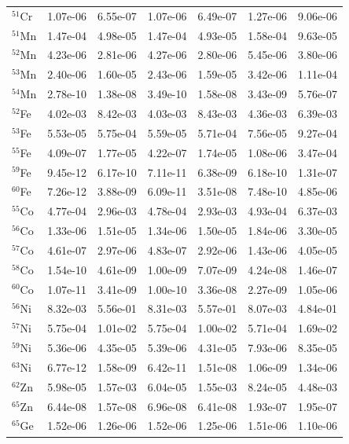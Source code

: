 \begin{table}
\begin{tabular}{l|cc|cc|cc}
$^{51}$Cr & 1.07e-06 & 6.55e-07 & 1.07e-06 & 6.49e-07 & 1.27e-06 & 9.06e-06\\
$^{51}$Mn & 1.47e-04 & 4.98e-05 & 1.47e-04 & 4.93e-05 & 1.58e-04 & 9.63e-05\\
$^{52}$Mn & 4.23e-06 & 2.81e-06 & 4.27e-06 & 2.80e-06 & 5.45e-06 & 3.80e-06\\
$^{53}$Mn & 2.40e-06 & 1.60e-05 & 2.43e-06 & 1.59e-05 & 3.42e-06 & 1.11e-04\\
$^{54}$Mn & 2.78e-10 & 1.38e-08 & 3.49e-10 & 1.58e-08 & 3.43e-09 & 5.76e-07\\
$^{52}$Fe & 4.02e-03 & 8.42e-03 & 4.03e-03 & 8.43e-03 & 4.36e-03 & 6.39e-03\\
$^{53}$Fe & 5.53e-05 & 5.75e-04 & 5.59e-05 & 5.71e-04 & 7.56e-05 & 9.27e-04\\
$^{55}$Fe & 4.09e-07 & 1.77e-05 & 4.22e-07 & 1.74e-05 & 1.08e-06 & 3.47e-04\\
$^{59}$Fe & 9.45e-12 & 6.17e-10 & 7.11e-11 & 6.38e-09 & 6.18e-10 & 1.31e-07\\
$^{60}$Fe & 7.26e-12 & 3.88e-09 & 6.09e-11 & 3.51e-08 & 7.48e-10 & 4.85e-06\\
$^{55}$Co & 4.77e-04 & 2.96e-03 & 4.78e-04 & 2.93e-03 & 4.93e-04 & 6.37e-03\\
$^{56}$Co & 1.33e-06 & 1.51e-05 & 1.34e-06 & 1.50e-05 & 1.84e-06 & 3.30e-05\\
$^{57}$Co & 4.61e-07 & 2.97e-06 & 4.83e-07 & 2.92e-06 & 1.43e-06 & 4.05e-05\\
$^{58}$Co & 1.54e-10 & 4.61e-09 & 1.00e-09 & 7.07e-09 & 4.24e-08 & 1.46e-07\\
$^{60}$Co & 1.07e-11 & 3.41e-09 & 1.00e-10 & 3.36e-08 & 2.27e-09 & 1.05e-06\\
$^{56}$Ni & 8.32e-03 & 5.56e-01 & 8.31e-03 & 5.57e-01 & 8.07e-03 & 4.84e-01\\
$^{57}$Ni & 5.75e-04 & 1.01e-02 & 5.75e-04 & 1.00e-02 & 5.71e-04 & 1.69e-02\\
$^{59}$Ni & 5.36e-06 & 4.35e-05 & 5.39e-06 & 4.31e-05 & 7.93e-06 & 8.35e-05\\
$^{63}$Ni & 6.77e-12 & 1.58e-09 & 6.42e-11 & 1.51e-08 & 1.06e-09 & 1.34e-06\\
$^{62}$Zn & 5.98e-05 & 1.57e-03 & 6.04e-05 & 1.55e-03 & 8.24e-05 & 4.48e-03\\
$^{65}$Zn & 6.44e-08 & 1.57e-08 & 6.96e-08 & 6.41e-08 & 1.93e-07 & 1.95e-07\\
$^{65}$Ge & 1.52e-06 & 1.26e-06 & 1.52e-06 & 1.25e-06 & 1.51e-06 & 1.10e-06\\
\hline
\end{tabular}
\end{table}
